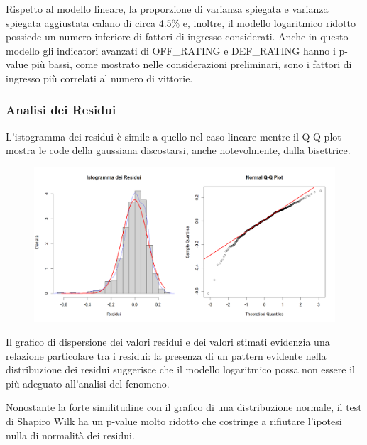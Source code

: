 \documentclass[11pt,a4paper]{article}
\begin{document}
Rispetto al modello lineare, la proporzione di varianza spiegata e varianza spiegata aggiustata calano di circa 4.5\% e, inoltre, il modello logaritmico ridotto possiede un numero inferiore di fattori di ingresso considerati. Anche in questo modello gli indicatori avanzati di OFF\_RATING e DEF\_RATING hanno i p-value più bassi, come mostrato nelle considerazioni preliminari, sono i fattori di ingresso più correlati al numero di vittorie.

\subsubsection{Analisi dei Residui}
 L'istogramma dei residui è simile a quello nel caso lineare mentre il Q-Q plot mostra le code della gaussiana discostarsi, anche notevolmente, dalla bisettrice.

\begin{figure}[h]
    \hspace{-1.5cm}
	\includegraphics[scale=0.55]{imgs/residuals_analysis_log_model.png}
    \end{figure}
\vspace{-0.4cm}

Il grafico di dispersione dei valori residui e dei valori stimati evidenzia una relazione particolare tra i residui: la presenza di un pattern evidente nella distribuzione dei residui suggerisce che il modello logaritmico possa non essere il più adeguato all'analisi del fenomeno.

Nonostante la forte similitudine con il grafico di una distribuzione normale, il test di Shapiro Wilk ha un p-value molto ridotto che costringe a rifiutare l'ipotesi nulla di normalità dei residui.
\end{document}

